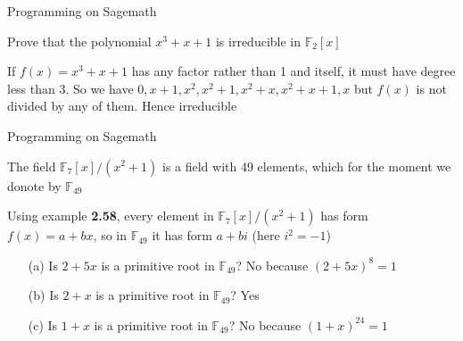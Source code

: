 \begin{exer}[2.35, 2.36] Programming on Sagemath\end{exer}

\begin{exer}[2.37]Prove that the polynomial $x^3+x+1$ is irreducible in $\mathbb{F}_2[x]$

If $f(x) = x^3+x+1$ has any factor rather than 1 and itself, it must have degree less than 3. So we have $0, x+1, x^2, x^2+1, x^2+x, x^2+x+1, x$ but $f(x)$ is not divided by any of them. Hence irreducible
\end{exer}

\begin{exer}[2.38] Programming on Sagemath\end{exer}

\begin{exer}[2.39] The field $\mathbb{F}_7[x]/(x^2+1)$ is a field with 49 elements, which for the moment we donote by $\mathbb{F}_{49}$

Using example \textbf{2.58}, every element in $\mathbb{F}_7[x]/(x^2+1)$ has form $f(x)=a+bx$, so in $\mathbb{F}_{49}$ it has form $a+bi$ (here $i^2=-1$)
\begin{enumerate}
    \item [(a)] Is $2+5x$ is a primitive root in $\mathbb{F}_{49}$? No because $(2+5x)^8=1$
    \item [(b)] Is $2+x$ is a primitive root in $\mathbb{F}_{49}$? Yes
    \item [(c)] Is $1+x$ is a primitive root in $\mathbb{F}_{49}$? No because $(1+x)^{24} = 1$
\end{enumerate}
\end{exer}

